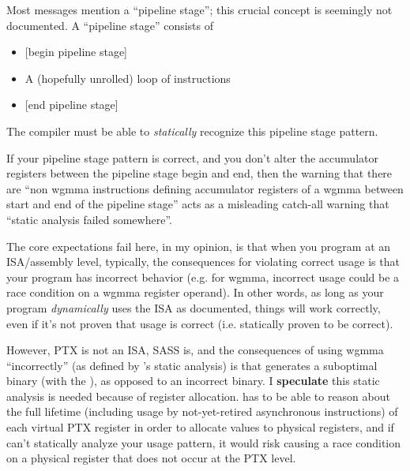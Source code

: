 \filbreak
{}


Most messages mention a ``pipeline stage''; this crucial concept is seemingly not documented.
A ``pipeline stage'' consists of
\begin{itemize}
  \item {} [begin pipeline stage]
  \item A (hopefully unrolled) loop of  instructions
  \item {} [end pipeline stage]
\end{itemize}
The compiler must be able to \textit{statically} recognize this pipeline stage pattern.

\filbreak
{}

If your pipeline stage pattern is correct, and you don't alter the accumulator registers between the pipeline stage begin and end, then the warning that there are ``non wgmma instructions defining accumulator registers of a wgmma between start and end of the pipeline stage'' acts as a misleading catch-all warning that ``static analysis failed somewhere''.

\filbreak
The core expectations fail here, in my opinion, is that when you program at an ISA/assembly level, typically, the consequences for violating correct usage is that your program has incorrect behavior (e.g. for wgmma, incorrect usage could be a race condition on a wgmma register operand).
In other words, as long as your program \textit{dynamically} uses the ISA as documented, things will work correctly, even if it's not proven that usage is correct (i.e. statically proven to be correct).

\filbreak
However, PTX is not an ISA, SASS is, and the consequences of using wgmma ``incorrectly'' (as defined by 's static analysis) is that  generates a suboptimal binary (with the ), as opposed to an incorrect binary.
I \textbf{speculate} this static analysis is needed because of register allocation.  has to be able to reason about the full lifetime (including usage by not-yet-retired asynchronous instructions) of each virtual PTX register in order to allocate values to physical registers, and if  can't statically analyze your usage pattern, it would risk causing a race condition on a physical register that does not occur at the PTX level.

